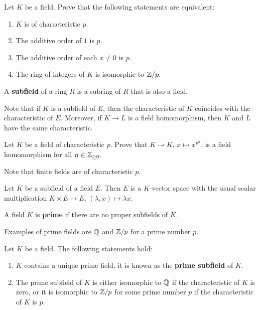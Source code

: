 \begin{exercise}
	Let $K$ be a field. Prove that
	the following statements are equivalent:
	\begin{enumerate}
		\item $K$ is of characteristic $p$.
		\item The additive order of $1$ is $p$. 
		\item The additive order of each $x\ne0$ is $p$.
		\item The ring of integers of $K$ is isomorphic to $\mathbb{Z}/p$.
	\end{enumerate}
\end{exercise}



\begin{definition}
	A \textbf{subfield} of a ring $R$ is a subring of $R$ 
	that is also a field.
\end{definition}

Note that if $K$ is a subfield of $E$, then
the characteristic of $K$ coincides
with the characteristic 
of $E$. Moreover, if $K\to L$ is a field homomorphism, then
$K$ and $L$ have the same characteristic. 

\begin{exercise}
	Let $K$ be a field of characteristic $p$. Prove
	that $K\to K$, $x\mapsto x^{p^n}$, is a field homomorphism
	for all $n\in\mathbb{Z}_{\geq 0}$. 
\end{exercise}

Note that finite fields are of characteristic $p$. 

Let $K$ be a subfield of a field $E$. Then $E$ 
is a $K$-vector space with the usual scalar multiplication
$K\times E\to E$, 
$(\lambda, x)\mapsto \lambda x$.

\begin{definition}
	A field $K$ is \textbf{prime} if there are no
	proper subfields of $K$. 
\end{definition}

Examples of prime fields are $\mathbb{Q}$ and $\mathbb{Z}/p$ for a prime number $p$.

\begin{proposition}
	Let $K$ be a field. The following statements hold:
	\begin{enumerate}
		\item $K$ contains a unique prime field, it is known as the 
			\textbf{prime subfield} of $K$.
		\item The prime subfield of $K$ is either isomorphic to $\mathbb{Q}$ if 
			the characteristic of $K$ is zero, or it is isomorphic to $\mathbb{Z}/p$ for
			some prime number $p$ if the characteristic of $K$ is $p$. 
	\end{enumerate}
\end{proposition}

